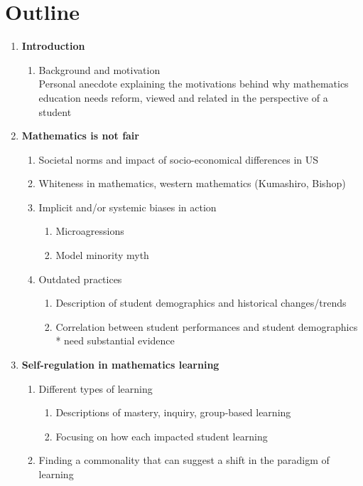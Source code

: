 \chapter{Outline}
\begin{enumerate}
  \item {\bf Introduction }
  \begin{enumerate}
    \item Background and motivation \\
      Personal anecdote explaining the motivations behind why mathematics education needs reform, viewed and related in the perspective of a student
  \end{enumerate}
  \item {\bf Mathematics is not fair }
    \begin{enumerate}
      \item Societal norms and impact of socio-economical differences in US
      \item Whiteness in mathematics, western mathematics (Kumashiro, Bishop)
      \item Implicit and/or systemic biases in action
      \begin{enumerate}
        \item Microagressions
        \item Model minority myth
      \end{enumerate}
      \item Outdated practices
      \begin{enumerate}
        \item Description of student demographics and historical changes/trends
        \item Correlation between student performances and student demographics
        \\ * need substantial evidence
      \end{enumerate}
    \end{enumerate}
    \item{\bf Self-regulation in mathematics learning}
    \begin{enumerate}
      \item Different types of learning
      \begin{enumerate}
        \item Descriptions of mastery, inquiry, group-based learning
        \item Focusing on how each impacted student learning
      \end{enumerate}
      \item Finding a commonality that can suggest a shift in the paradigm of learning

\end{enumerate}
\end{enumerate}
